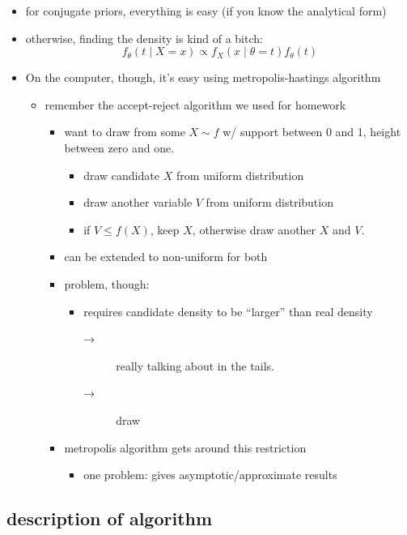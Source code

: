 \begin{itemize}
\item for conjugate priors, everything is easy (if you know the analytical form)
\item otherwise, finding the density is kind of a bitch:
      \[f_\theta(t \mid X = x) \propto f_X(x \mid \theta = t) f_\theta(t)\]
\item On the computer, though, it's easy using metropolis-hastings algorithm
\begin{itemize}
\item remember the accept-reject algorithm we used for homework
\begin{itemize}
\item want to draw from some $X \sim f$ w/ support between 0 and 1,
         height between zero and one.
\begin{itemize}
\item draw candidate $X$ from uniform distribution
\item draw another variable $V$ from uniform distribution
\item if $V \leq f(X)$, keep $X$, otherwise draw another $X$ and $V$.
\end{itemize}
\item can be extended to non-uniform for both
\item problem, though:
\begin{itemize}
\item requires candidate density to be ``larger'' than real density
\begin{description}
\item[→] really talking about in the tails.
\item[→] draw
\end{description}
\end{itemize}
\item metropolis algorithm gets around this restriction
\begin{itemize}
\item one problem: gives asymptotic/approximate results
\end{itemize}
\end{itemize}
\end{itemize}
\end{itemize}

\subsection{description of algorithm \citep[page 254]{CaB_2001}}

